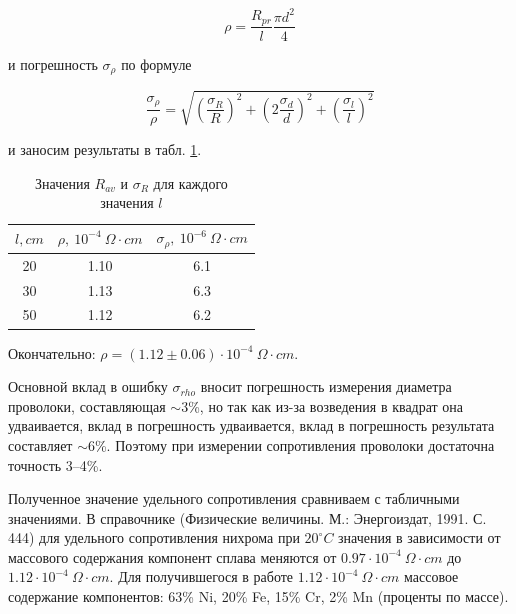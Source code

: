 \documentclass[14pt, a4paper]{article}
\begin{document}
\begin{enumerate}
\[\rho=\frac{R_{pr}}{l}\frac{\pi d^2}{4}\]

и погрешность $\sigma_{\rho}$ по формуле

\[\frac{\sigma_{\rho}}{\rho}=\sqrt{\left(\frac{\sigma_R}{R}\right)^2+\left(2\frac{\sigma_d}{d}\right)^2+\left(\frac{\sigma_l}{l}\right)^2}\]

и заносим результаты в табл. \ref{table6}.

\begin{table}[!h]
\centering
\begin{tabular}{| c | c | c |}
\hline
$l, cm$ & $\rho,\ 10^{-4}\ \Omega\cdot cm$ & $\sigma_{\rho},\ 10^{-6}\ \Omega\cdot cm$ \\
\hline
20 & 1.10 & 6.1 \\
30 & 1.13 & 6.3 \\
50 & 1.12 & 6.2 \\
\hline
\end{tabular}
\caption{Значения $R_{av}$ и $\sigma_R$ для каждого значения $l$}
\label{table6}
\end{table}

\end{enumerate}

Окончательно: $\rho=(1.12\pm0.06)\cdot10^{-4}\ \Omega\cdot cm.$

\par

Основной вклад в ошибку $\sigma_{rho}$ вносит погрешность измерения диаметра проволоки, составляющая $\sim$3\%, но так как из-за возведения в квадрат она удваивается, вклад в погрешность удваивается, вклад в погрешность результата составляет $\sim$6\%. Поэтому при измерении сопротивления проволоки достаточна точность 3--4\%.

\par

Полученное значение удельного сопротивления сравниваем с табличными значениями. В справочнике (Физические величины. М.: Энергоиздат, 1991. С. 444) для удельного сопротивления нихрома при $20^{\circ}C$ значения в зависимости от массового содержания компонент сплава меняются от $0.97\cdot10^{-4}\ \Omega\cdot cm$ до $1.12\cdot10^{-4}\ \Omega\cdot cm$. Для получившегося в работе $1.12\cdot10^{-4}\ \Omega\cdot cm$ массовое содержание компонентов: 63\% Ni, 20\% Fe, 15\% Cr, 2\% Mn (проценты по массе).
\end{document}
